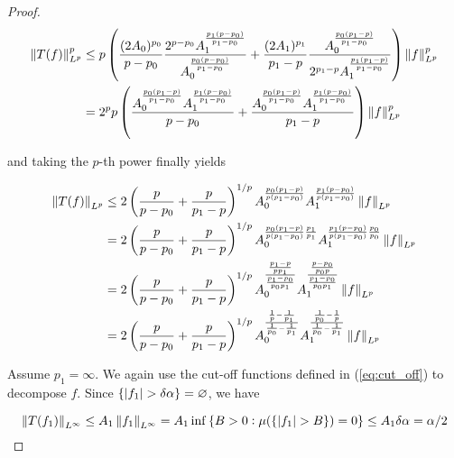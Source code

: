 \begin{proof}
		\begin{equation*}
			\begin{aligned}
				\norm[0]{T(f)}_{L^p}^p &\leq p\del{ \frac{(2A_0)^{p_0}}{p - p_0}\frac{2^{p - p_0}A_1^\frac{p_1(p-p_0)}{p_1-p_0}}{A_0^\frac{p_0(p-p_0)}{p_1 - p_0}} + \frac{(2A_1)^{p_1}}{p_1 - p} \frac{A_0^\frac{p_0(p_1 - p)}{p_1 - p_0}}{2^{p_1 - p}A_1^\frac{p_1(p_1 - p)}{p_1 - p_0}} }\norm[0]{f}_{L^p}^p\\
				&=  2^pp\del{ \frac{A_0^\frac{p_0(p_1 - p)}{p_1 - p_0}A_1^\frac{p_1(p-p_0)}{p_1-p_0}}{p - p_0} + \frac{A_0^\frac{p_0(p_1 - p)}{p_1 - p_0}A_1^\frac{p_1(p - p_0)}{p_1 - p_0}}{p_1- p} }\norm[0]{f}_{L^p}^p\\
			\end{aligned}
		\end{equation*}

		\noindent and taking the $p$-th power finally yields

		\begin{equation*}
			\begin{aligned}
				\norm[0]{T(f)}_{L^p} &\leq 2\del{ \frac{p}{p - p_0} + \frac{p}{p_1- p} }^{1/p} A_0^\frac{p_0(p_1 - p)}{p(p_1 - p_0)}A_1^\frac{p_1(p - p_0)}{p(p_1 - p_0)}\norm[0]{f}_{L^p}\\
				&= 2\del{ \frac{p}{p - p_0} + \frac{p}{p_1- p} }^{1/p} A_0^{\frac{p_0(p_1 - p)}{p(p_1 - p_0)}\frac{p_1}{p_1}}A_1^{\frac{p_1(p - p_0)}{p(p_1 - p_0)}\frac{p_0}{p_0}}\norm[0]{f}_{L^p}\\
				&= 2\del{ \frac{p}{p - p_0} + \frac{p}{p_1- p} }^{1/p} A_0^{\frac{\frac{p_1 - p}{pp_1}}{\frac{p_1 - p_0}{p_0p_1}}}A_1^{\frac{\frac{p - p_0}{p_0p}}{\frac{p_1 - p_0}{p_0p_1}}}\norm[0]{f}_{L^p}\\
				&= 2\del{ \frac{p}{p - p_0} + \frac{p}{p_1- p} }^{1/p} A_0^{\frac{\frac{1}{p} - \frac{1}{p_1}}{\frac{1}{p_0} - \frac{1}{p_1}}}A_1^{\frac{\frac{1}{p_0} - \frac{1}{p}}{\frac{1}{p_0} - \frac{1}{p_1}}}\norm[0]{f}_{L^p}
			\end{aligned}
		\end{equation*}

		Assume \underline{$p_1 = \infty$}. We again use the cut-off functions defined in (\ref{eq:cut_off}) to decompose $f$.  Since $\cbr[0]{\abs[0]{ f_1} > \delta\alpha } = \varnothing$, we have 

\begin{equation*}
	\norm[0]{T(f_1)}_{L^\infty} \leq A_1 \norm[0]{f_1}_{L^\infty} = A_1 \inf \cbr[0]{B > 0: \mu(\cbr[0]{\abs[0]{ f_1 } > B}) = 0 } \leq A_1\delta\alpha = \alpha/2
\end{equation*}


\end{proof}
